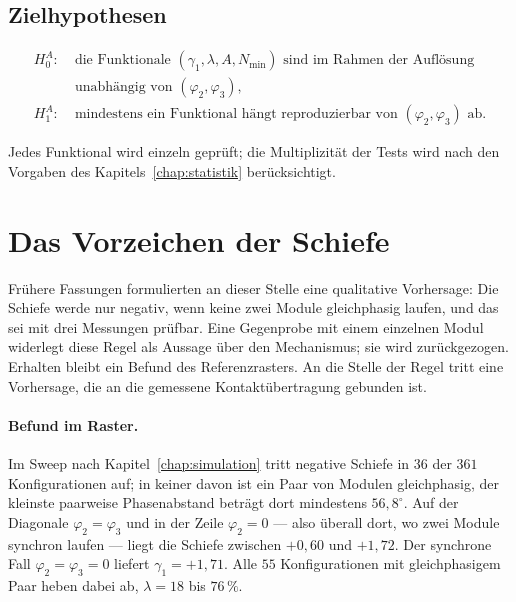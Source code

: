 \documentclass[12pt,a4paper]{report}
\begin{document}
\subsection*{Zielhypothesen}

\begin{align}
  H_{0}^{A} :\;& \text{die Funktionale } (\gamma_1, \lambda, A, N_{\min})
                 \text{ sind im Rahmen der Auflösung} \nonumber\\
               & \text{unabhängig von } (\varphi_2, \varphi_3),
                 \label{eq:h0-a}\\[2pt]
  H_{1}^{A} :\;& \text{mindestens ein Funktional hängt reproduzierbar von }
                 (\varphi_2, \varphi_3) \text{ ab.} \label{eq:h1-a}
\end{align}

Jedes Funktional wird einzeln geprüft; die Multiplizität der Tests wird
nach den Vorgaben des Kapitels~\ref{chap:statistik} berücksichtigt.

\section{Das Vorzeichen der Schiefe}
\label{sec:vorhersage-schiefe}

Frühere Fassungen formulierten an dieser Stelle eine qualitative
Vorhersage: Die Schiefe werde nur negativ, wenn keine zwei Module
gleichphasig laufen, und das sei mit drei Messungen prüfbar. Eine
Gegenprobe mit einem einzelnen Modul widerlegt diese Regel als Aussage
über den Mechanismus; sie wird zurückgezogen. Erhalten bleibt ein Befund
des Referenzrasters. An die Stelle der Regel tritt eine Vorhersage, die
an die gemessene Kontaktübertragung gebunden ist.

\paragraph{Befund im Raster.}
Im Sweep nach Kapitel~\ref{chap:simulation} tritt negative Schiefe in
$36$ der $361$ Konfigurationen auf; in keiner davon ist ein Paar von
Modulen gleichphasig, der kleinste paarweise Phasenabstand beträgt dort
mindestens $56{,}8^\circ$. Auf der Diagonale $\varphi_2 = \varphi_3$ und
in der Zeile $\varphi_2 = 0$ --- also überall dort, wo zwei Module
synchron laufen --- liegt die Schiefe zwischen $+0{,}60$ und $+1{,}72$.
Der synchrone Fall $\varphi_2 = \varphi_3 = 0$ liefert
$\gamma_1 = +1{,}71$. Alle $55$ Konfigurationen mit gleichphasigem Paar
heben dabei ab, $\lambda = 18$ bis $76\,\%$.
\end{document}
